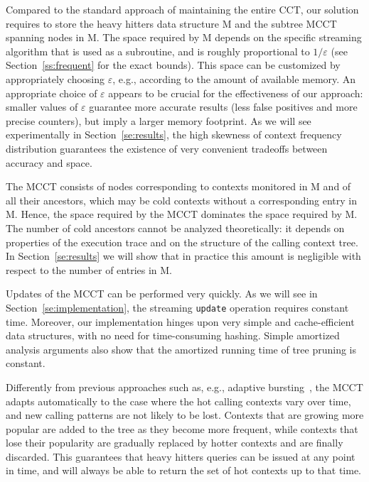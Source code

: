 \documentclass{sigplanconf}
\begin{document}
Compared to the standard approach of maintaining the entire CCT, our solution requires to store the heavy hitters data structure M and the subtree MCCT spanning nodes in M. The space required by M depends on the specific streaming algorithm that is used as a subroutine, and is roughly proportional to $1/\varepsilon$ (see Section~\ref{ss:frequent} for the exact bounds). This space can be customized by appropriately choosing $\varepsilon$, e.g., according to the amount of available memory. An appropriate choice of $\varepsilon$ appears to be crucial for the effectiveness of our approach: smaller values of $\varepsilon$ guarantee more accurate results (less false positives and more precise counters), but imply a larger memory footprint. As we will see experimentally in Section~\ref{se:results}, the high skewness of context frequency distribution guarantees the existence of very convenient tradeoffs between accuracy and space.

The MCCT consists of nodes corresponding to contexts monitored in M and of all their ancestors, which may be cold contexts without a corresponding entry in M. Hence, the space required by the MCCT  dominates the space required by M. The number of cold ancestors cannot be analyzed theoretically: it depends on properties of the execution trace and on the structure of the calling context tree. In Section~\ref{se:results} we will show that in practice this amount is negligible with respect to the number of entries in M.

Updates of the MCCT can be performed very quickly. As we will see in Section~\ref{se:implementation}, the streaming {\tt update} operation requires constant time. Moreover, our implementation hinges upon very simple and cache-efficient data structures, with no need for time-consuming hashing. Simple amortized analysis arguments also show that the amortized running time of tree pruning is constant. 

Differently from previous approaches such as, e.g., adaptive bursting~\cite{ZSCC06}, the MCCT adapts automatically to the case where the hot calling contexts vary over time, and new calling patterns are not likely to be lost. Contexts that are growing more popular are added to the tree as they become more frequent, while contexts that lose their popularity are gradually replaced by hotter contexts and are finally discarded. This guarantees that heavy hitters queries can be issued at any point in time, and will always be able to return the set of hot contexts up to that time.
\end{document}
